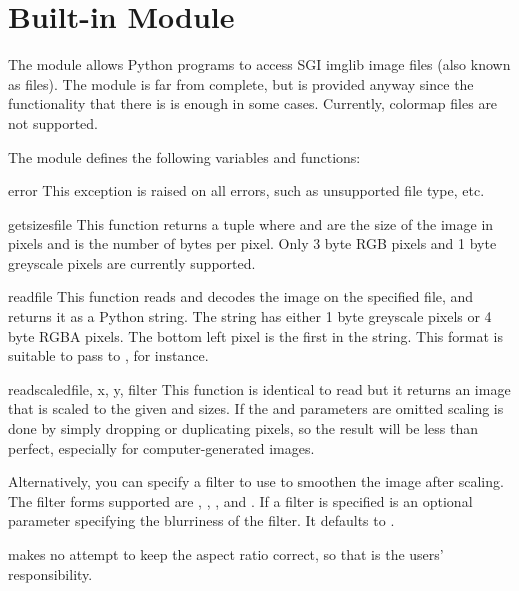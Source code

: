 \section{Built-in Module }
\label{module-imgfile}

The  module allows Python programs to access SGI imglib image
files (also known as  files).  The module is far from
complete, but is provided anyway since the functionality that there is
is enough in some cases.  Currently, colormap files are not supported.

The module defines the following variables and functions:

\begin{excdesc}{error}
This exception is raised on all errors, such as unsupported file type, etc.
\end{excdesc}

\begin{funcdesc}{getsizes}{file}
This function returns a tuple  where
 and  are the size of the image in pixels and
 is the number of
bytes per pixel. Only 3 byte RGB pixels and 1 byte greyscale pixels
are currently supported.
\end{funcdesc}

\begin{funcdesc}{read}{file}
This function reads and decodes the image on the specified file, and
returns it as a Python string. The string has either 1 byte greyscale
pixels or 4 byte RGBA pixels. The bottom left pixel is the first in
the string. This format is suitable to pass to ,
for instance.
\end{funcdesc}

\begin{funcdesc}{readscaled}{file, x, y, filter}
This function is identical to read but it returns an image that is
scaled to the given  and  sizes. If the  and
 parameters are omitted scaling is done by
simply dropping or duplicating pixels, so the result will be less than
perfect, especially for computer-generated images.

Alternatively, you can specify a filter to use to smoothen the image
after scaling. The filter forms supported are ,
, ,  and
. If a filter is specified  is an optional
parameter specifying the blurriness of the filter. It defaults to .

 makes no attempt to keep the aspect ratio
correct, so that is the users' responsibility.
\end{funcdesc}

